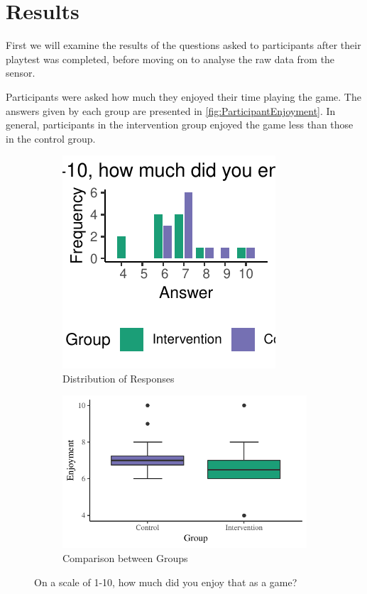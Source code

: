 \documentclass[12pt,a4paper]{article}\usepackage[]{graphicx}\usepackage[]{color}
\makeatletter
\def\maxwidth{ %
  \ifdim\Gin@nat@width>\linewidth
    \linewidth
  \else
    \Gin@nat@width
  \fi
}
\makeatother
\begin{document}
\section{Results}

First we will examine the results of the questions asked to participants after their playtest was completed, before moving on to analyse the raw data from the sensor.

Participants were asked how much they enjoyed their time playing the game.
The answers given by each group are presented in \vref{fig:ParticipantEnjoyment}.
In general, participants in the intervention group enjoyed the game less than those in the control group.

\begin{figure}
  \centering
  \begin{subfigure}[t]{.49\linewidth}


{\centering \includegraphics[width=\maxwidth]{figure/ParticipantEnjoyment-1} 

}



  	\caption{Distribution of Responses}
  \end{subfigure}
  \begin{subfigure}[t]{.49\linewidth}


{\centering \includegraphics[width=\maxwidth]{figure/ParticipantEnjoymentBoxPlot-1} 

}



  	\caption{Comparison between Groups}
  \end{subfigure}
  \caption{On a scale of 1-10, how much did you enjoy that as a game?}
  \label{fig:ParticipantEnjoyment}
\end{figure}
\end{document}
